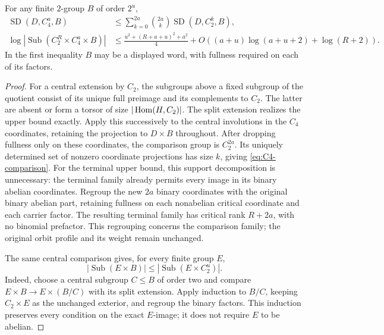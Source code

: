 \begin{lemma}\label{lem:mixture-Hall}
For any finite $2$-group $B$ of order $2^u$,
\begin{align}\label{eq:C4-comparison}
 \operatorname{SD}(D,C_4^a,B)
 &\leq\sum_{k=0}^{2a}\binom{2a}{k}
                 \operatorname{SD}(D,C_2^k,B),\\
 \log|\operatorname{Sub}(C_2^R\times C_4^a\times B)|
 &\leq\frac{u^2+(R+a+u)^2+a^2}{4}
       +O((a+u)\log(a+u+2)+\log(R+2)).\label{eq:Hall-mixture}
\end{align}
In the first inequality $B$ may be a displayed word, with fullness
required on each of its factors.
\end{lemma}
\begin{proof}
For a central extension by $C_2$, the subgroups above a fixed subgroup
of the quotient consist of its unique full preimage and its complements
to $C_2$. The latter are absent or form a torsor of size
$|\operatorname{Hom}(H,C_2)|$. The split extension realizes the upper bound exactly.
Apply this successively to the central involutions in the $C_4$
coordinates, retaining the projection to $D\times B$ throughout.
After dropping fullness only on these coordinates, the comparison
group is $C_2^{2a}$. Its uniquely determined set of nonzero coordinate
projections has size $k$, giving \eqref{eq:C4-comparison}.
For the terminal upper bound, this support decomposition is unnecessary:
the terminal family already permits every image in its binary abelian
coordinates. Regroup the new $2a$ binary coordinates with the original
binary abelian part, retaining fullness on each nonabelian critical
coordinate and each carrier factor. The resulting terminal family has
critical rank $R+2a$, with no binomial prefactor. This regrouping concerns
the comparison family; the original orbit profile and its weight remain
unchanged.

The same central comparison gives, for every finite group $E$,
\[
 |\operatorname{Sub}(E\times B)|
 \leq |\operatorname{Sub}(E\times C_2^u)|.
\]
Indeed, choose a central subgroup $C\leq B$ of order two and compare
$E\times B\to E\times(B/C)$ with its split extension. Apply induction
to $B/C$, keeping $C_2\times E$ as the unchanged exterior, and regroup
the binary factors. This induction preserves every condition on the
exact $E$-image; it does not require $E$ to be abelian.


\end{proof}

